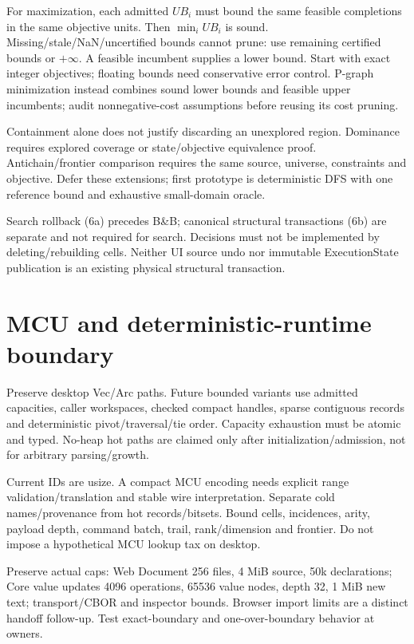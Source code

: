 \documentclass[10pt,a4paper]{article}
\begin{document}
For maximization, each admitted $UB_i$ must bound the same feasible completions in the same objective units. Then $\min_i UB_i$ is sound. Missing/stale/NaN/uncertified bounds cannot prune: use remaining certified bounds or $+\infty$. A feasible incumbent supplies a lower bound. Start with exact integer objectives; floating bounds need conservative error control. P-graph minimization instead combines sound lower bounds and feasible upper incumbents; audit nonnegative-cost assumptions before reusing its cost pruning.

Containment alone does not justify discarding an unexplored region. Dominance requires explored coverage or state/objective equivalence proof. Antichain/frontier comparison requires the same source, universe, constraints and objective. Defer these extensions; first prototype is deterministic DFS with one reference bound and exhaustive small-domain oracle.

Search rollback (6a) precedes B\&B; canonical structural transactions (6b) are separate and not required for search. Decisions must not be implemented by deleting/rebuilding cells. Neither UI source undo nor immutable ExecutionState publication is an existing physical structural transaction.

\section{MCU and deterministic-runtime boundary}
\label{sec:mcu}
Preserve desktop Vec/Arc paths. Future bounded variants use admitted capacities, caller workspaces, checked compact handles, sparse contiguous records and deterministic pivot/traversal/tie order. Capacity exhaustion must be atomic and typed. No-heap hot paths are claimed only after initialization/admission, not for arbitrary parsing/growth.

Current IDs are usize. A compact MCU encoding needs explicit range validation/translation and stable wire interpretation. Separate cold names/provenance from hot records/bitsets. Bound cells, incidences, arity, payload depth, command batch, trail, rank/dimension and frontier. Do not impose a hypothetical MCU lookup tax on desktop.

Preserve actual caps: Web Document 256 files, 4 MiB source, 50k declarations; Core value updates 4096 operations, 65536 value nodes, depth 32, 1 MiB new text; transport/CBOR and inspector bounds. Browser import limits are a distinct handoff follow-up. Test exact-boundary and one-over-boundary behavior at owners.
\end{document}
